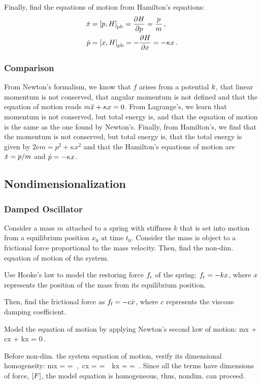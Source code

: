 Finally, find the equations of motion from Hamilton's equations:
\begin{align*}
\dot{x} &= \left[{p, H}\right]_{\text{pb}} = \dfrac{\partial{H}}{\partial{p}}  = \dfrac{p}{m}\,,\\
\dot{p} &= \left[{x, H}\right]_{\text{pb}} = -\dfrac{\partial{H}}{\partial{x}} = -\kappa x\,.
\end{align*}

\subsubsection{Comparison}
From Newton's formalism, we know that $f$ arises from a potential $k$, that linear momentum is not conserved, that angular momentum is not defined and that the equation of motion reads $m\ddot{x} + \kappa x = 0$. From Lagrange's, we learn that momentum is not conserved, but total energy is, and that the equation of motion is the same as the one found by Newton's. Finally, from Hamilton's, we find that the momentum is not conserved, but total energy is, that the total energy is given by $2em = p^2 + \kappa x^2$ and that the Hamilton's equations of motion are $\dot{x} = p/m$ and $\dot{p} = -\kappa x$.


\subsection{Nondimensionalization}


\subsubsection{Damped Oscillator}
Consider a mass $m$ attached to a spring with stiffness $k$ that is set into motion from a equilibrium position $x_0$ at time $t_0$. Consider the mass is object to a frictional force proportional to the mass velocity. Then, find the non-dim. equation of motion of the system.

Use Hooke's law to model the restoring force $f_\text{r}$ of the spring: $f_\text{r} = -kx$, where $x$ represents the position of the mass from its equilibrium position.

Then, find the frictional force as $f_\text{f} = -c\dot{x}$, where $c$ represents the viscous damping coefficient.

Model the equation of motion by applying Newton's second law of motion:
\beq
m\ddt x + c\dt x + kx = 0\,.
\eeq

Before non-dim. the system equation of motion, verify its dimensional homogeneity:
\beq
\dim m\ddt x =  = \,,\,
 \dim c\dt x =  = \,\,
     \dim kx =  = \,.
\eeq
Since all the terms have dimensions of force, $\left[{F}\right]$, the model equation is homogeneous, thus, nondim. can proceed.

